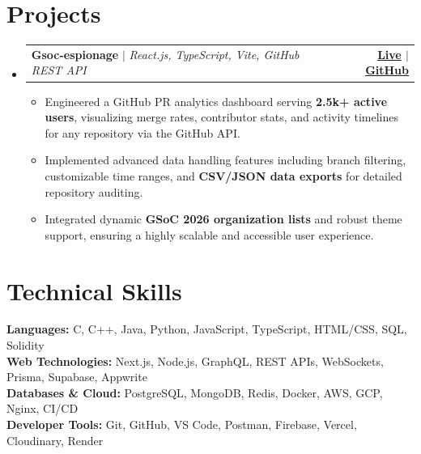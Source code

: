 \documentclass[letterpaper,11pt]{article}
\makeatletter
\newcommand{\resumeItem}[1]{
  \item\small{
    {#1 \vspace{-2pt}}
  }
}
\newcommand{\resumeProjectHeading}[2]{
    \item
    \begin{tabular*}{1.001\textwidth}{l@{\extracolsep{\fill}}r}
      \small#1 & \textbf{\small #2}\\
    \end{tabular*}\vspace{-7pt}
}
\newcommand{\resumeSubHeadingListStart}{\begin{itemize}[leftmargin=0.0in, label={}]}
\newcommand{\resumeSubHeadingListEnd}{\end{itemize}}
\newcommand{\resumeItemListStart}{\begin{itemize}[itemsep=-2pt]}
\newcommand{\resumeItemListEnd}{\end{itemize}\vspace{-5pt}}
\makeatother
\begin{document}
\section{Projects}
  \resumeSubHeadingListStart
    \resumeProjectHeading
      {\textbf{Gsoc-espionage} $|$ \emph{React.js, TypeScript, Vite, GitHub REST API}}{\href{https://gsoc.app/}{\textbf{Live}} $|$ \href{https://github.com/mr-raj12/Gsoc-espionage}{\textbf{GitHub}}}
      \resumeItemListStart
        \resumeItem{Engineered a GitHub PR analytics dashboard serving \textbf{2.5k+ active users}, visualizing merge rates, contributor stats, and activity timelines for any repository via the GitHub API.}
        \resumeItem{Implemented advanced data handling features including branch filtering, customizable time ranges, and \textbf{CSV/JSON data exports} for detailed repository auditing.}
        \resumeItem{Integrated dynamic \textbf{GSoC 2026 organization lists} and robust theme support, ensuring a highly scalable and accessible user experience.}
      \resumeItemListEnd

  \resumeSubHeadingListEnd

\section{Technical Skills}
 \begin{itemize}[leftmargin=0.15in, label={}]
    \small{\item{
     \textbf{Languages:} C, C++, Java, Python, JavaScript, TypeScript, HTML/CSS, SQL, Solidity \\
     \textbf{Web Technologies:} Next.js, Node.js, GraphQL, REST APIs, WebSockets, Prisma, Supabase, Appwrite \\
     \textbf{Databases \& Cloud:} PostgreSQL, MongoDB, Redis, Docker, AWS, GCP, Nginx, CI/CD \\
     \textbf{Developer Tools:} Git, GitHub, VS Code, Postman, Firebase, Vercel, Cloudinary, Render
    }}
 \end{itemize}
\end{document}
